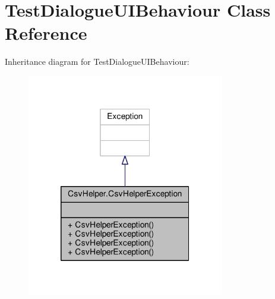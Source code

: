 \hypertarget{a00171}{\section{Test\-Dialogue\-U\-I\-Behaviour Class Reference}
\label{a00171}
}


Inheritance diagram for Test\-Dialogue\-U\-I\-Behaviour\-:
\nopagebreak
\begin{figure}[H]
\begin{center}
\leavevmode
\includegraphics[width=244pt]{a00408}
\end{center}
\end{figure}


